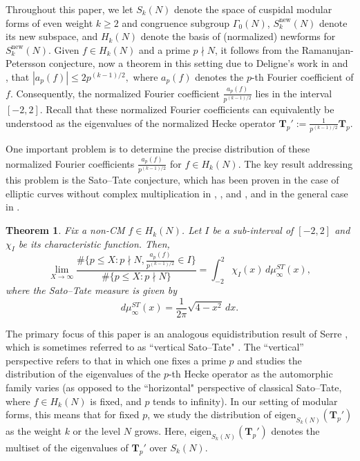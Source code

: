 \documentclass[11pt,letterpaper,reqno]{amsart}
\newtheorem{theorem}{Theorem}[section]
\theoremstyle{definition}
\numberwithin{equation}{section}
\numberwithin{figure}{section}
\numberwithin{table}{section}
\newcommand{\nw}{\mathrm{new}}
\begin{document}
Throughout this paper, we let $S_k(N)$ denote the space of cuspidal modular forms of even weight $k \geq 2$ and congruence subgroup $\Gamma_0(N)$, $S_k^\nw(N)$ denote its new subspace, and $H_k(N)$ denote the basis of (normalized) newforms for $S_k^{\nw}(N)$. Given $f \in H_k (N)$ and a prime $p \nmid N$, it follows from the Ramanujan-Petersson conjecture, now a theorem in this setting due to Deligne's work in \cite{Deligne1973Formes} and \cite{Del74}, that
$|a_p(f)| \leq 2p^{(k - 1)/2},$
where $a_p(f)$ denotes the $p$-th Fourier coefficient of $f.$ Consequently, the normalized Fourier coefficient $\frac{a_p(f)}{p^{(k - 1)/2}}$ lies in the interval $[-2, 2]$. Recall that these normalized Fourier coefficients can equivalently be understood as the eigenvalues of the normalized Hecke operator $\mathbf{T}_p' := \frac{1}{p^{(k-1)/2}} \mathbf{T}_p$. 


One important problem is to determine the precise distribution of these normalized Fourier coefficients $\frac{a_p(f)}{p^{(k - 1)/2}}$ for $f \in H_k (N)$. The key result addressing this problem is the Sato--Tate conjecture, which has been proven in the case of elliptic curves without complex multiplication in \cite{CHT2008}, \cite{HSBT2010}, and \cite{Taylor2008}, and in the general case in \cite{BLGHT2011}.
{
\renewcommand{\thetheorem}{(Sato--Tate conjecture)}
\begin{theorem}
    Fix a non-CM $f \in H_k (N)$. Let $I$ be a sub-interval of $[-2, 2]$ and $\chi_I$ be its characteristic function. Then,
    $$\lim_{X \rightarrow \infty} \frac{\#\{ p \leq X : p \nmid N , \frac{a_p(f)}{p^{(k - 1)/2}}\in I\}}{\#\{ p \leq X : p \nmid N \}} = \int_{-2}^2 \chi_I (x)\, d\mu_{\infty}^{ST}(x),$$
    where the Sato--Tate measure is given by
    $$d\mu_{\infty}^{ST}(x) = \frac{1}{2\pi} \sqrt{4 - x^2} \,dx.$$
\end{theorem}
\addtocounter{theorem}{-1}
}
The primary focus of this paper is an analogous equidistribution result of Serre \cite{Ser97}, which is sometimes referred to as ``vertical Sato--Tate" \cite{Kim24}.  The ``vertical'' perspective refers to that in which one fixes a prime $p$ and studies the distribution of the eigenvalues of the $p$-th Hecke operator as the automorphic family varies (as opposed to the ``horizontal" perspective of classical Sato--Tate, where $f \in H_k(N)$ is fixed, and $p$ tends to infinity). In our setting of modular forms, this means that for fixed $p$, we study the distribution of $\mathrm{eigen}_{S_k(N)}(\mathbf{T}_p')$ as the weight $k$ or the level $N$ grows. Here, $\mathrm{eigen}_{S_k(N)}(\mathbf{T}_p')$ denotes the multiset of the eigenvalues of $\mathbf{T}_p'$ over $S_k(N).$ 
\end{document}
